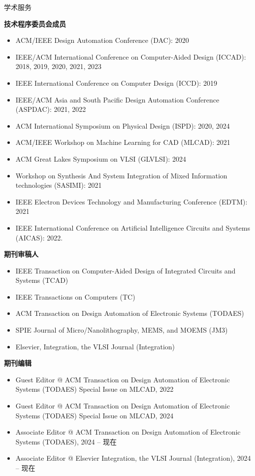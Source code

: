 
\begin{rSection}{学术服务}

\textbf{技术程序委员会成员}
\begin{itemize}
    \item ACM/IEEE Design Automation Conference (DAC): 2020
    \item IEEE/ACM International Conference on Computer-Aided Design (ICCAD): 2018, 2019, 2020, 2021, 2023
    \item IEEE International Conference on Computer Design (ICCD): 2019
    \item IEEE/ACM Asia and South Pacific Design Automation Conference (ASPDAC): 2021, 2022
    \item ACM International Symposium on Physical Design (ISPD): 2020, 2024
    \item ACM/IEEE Workshop on Machine Learning for CAD (MLCAD): 2021
    \item ACM Great Lakes Symposium on VLSI (GLVLSI): 2024
    \item Workshop on Synthesis And System Integration of Mixed Information technologies (SASIMI): 2021
    \item IEEE Electron Devices Technology and Manufacturing Conference (EDTM): 2021
    \item IEEE International Conference on Artificial Intelligence Circuits and Systems (AICAS): 2022. 
\end{itemize}

\textbf{期刊审稿人}
\begin{itemize}
    \item IEEE Transaction on Computer-Aided Design of Integrated Circuits and Systems (TCAD)
    \item IEEE Transactions on Computers (TC)
    \item ACM Transaction on Design Automation of Electronic Systems (TODAES)
    \item SPIE Journal of Micro/Nanolithography, MEMS, and MOEMS (JM3)
    \item Elsevier, Integration, the VLSI Journal (Integration)
\end{itemize}

\textbf{期刊编辑}
\begin{itemize}
    \item Guest Editor @ ACM Transaction on Design Automation of Electronic Systems (TODAES) Special Issue on MLCAD, 2022
    \item Guest Editor @ ACM Transaction on Design Automation of Electronic Systems (TODAES) Special Issue on MLCAD, 2024
    \item Associate Editor @ ACM Transaction on Design Automation of Electronic Systems (TODAES), 2024 -- 现在
    \item Associate Editor @ Elsevier Integration, the VLSI Journal (Integration), 2024 -- 现在
\end{itemize}


\end{rSection}
